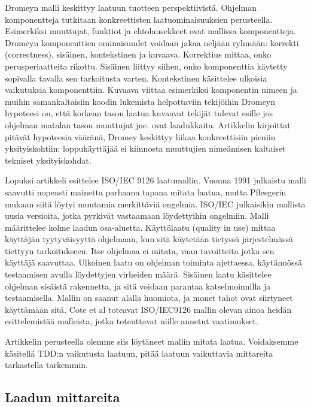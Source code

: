 \documentclass[finnish]{tktltiki2}
\theoremstyle{definition}
\theoremstyle{remark}
\begin{document}
Dromeyn malli keskittyy laatuun tuotteen perspektiivistä. Ohjelman komponentteja tutkitaan konkreettisten laatuominaisuuksien perusteella. Esimerkiksi muuttujat, funktiot ja ehtolausekkeet ovat mallissa komponentteja. Dromeyn komponenttien ominaisuudet voidaan jakaa neljään ryhmään: korrekti (correctness), sisäinen, kontekstinen ja kuvaava. Korrektius mittaa, onko perusperiaatteita rikottu. Sisäinen liittyy siihen, onko komponenttia käytetty sopivalla tavalla sen tarkoitusta varten.
 Kontekstinen käsittelee ulkoisia vaikutuksia komponenttiin. Kuvaava viittaa esimerkiksi komponentin nimeen ja muihin samankaltaisiin koodin lukemista helpottaviin tekijöihin
Dromeyn hypoteesi on, että korkean tason laatua kuvaavat tekijät tulevat esille jos ohjelman matalan tason muuttujat jne. ovat laadukkaita. Artikkelin kirjoittat pitävät hypoteesia vääränä, Dromey keskittyy liikaa konkreettisiin pieniin yksityiskohtiin: loppukäyttäjää ei kiinnosta muuttujien nimeämisen kaltaiset tekniset yksityiskohdat. \cite{Cote07}

Lopuksi artikkeli esittelee ISO/IEC 9126 laatumallin. Vuonna 1991 julkaistu malli saavutti nopeasti mainetta parhaana tapana mitata laatua, mutta Pfleegerin mukaan siitä löytyi muutamia merkittäviä ongelmia. ISO/IEC julkaisikin mallista uusia versioita, jotka pyrkivät vastaamaan löydettyihin ongelmiin. Malli määrittelee kolme laadun osa-aluetta. Käyttölaatu (quality in use) mittaa käyttäjän tyytyväisyyttä ohjelmaan, kun sitä käytetään tietyssä järjestelmässä tiettyyn tarkoitukseen. Itse ohjelmaa ei mitata, vaan tavoitteita jotka sen käyttäjä saavuttaa. Ulkoinen laatu on ohjelman toiminta ajettaessa, käytännössä testaamisen avulla löydettyjen virheiden määrä. Sisäinen laatu käsittelee ohjelman sisäistä rakennetta, ja sitä voidaan parantaa katselmoinnilla ja testaamisella. Mallin on saanut alalla huomiota, ja monet tahot ovat siirtyneet käyttämään sitä. Cote et al toteavat ISO/IEC9126 mallin olevan ainoa heidän esittelemistää malleista, jotka toteuttavat niille annetut vaatimukset. \cite{Cote07}

Artikkelin perusteella olemme siis löytäneet mallin mitata laatua. Voidaksemme käsitellä TDD:n vaikutusta laatuun, pitää laatuun vaikuttavia mittareita tarkastella tarkemmin.




\subsection{Laadun mittareita}
\end{document}

